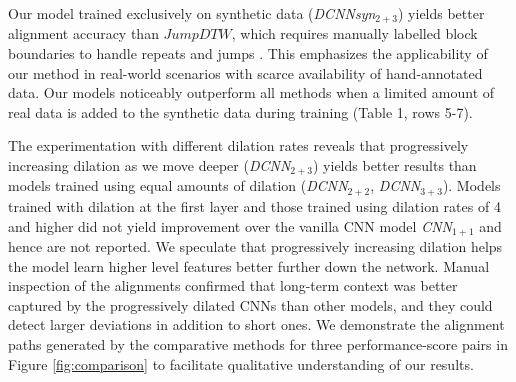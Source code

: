 \documentclass{article}
\begin{document}
Our model trained exclusively on synthetic data (\emph{DCNNsyn}${}_{2+3}$) yields better alignment accuracy than \begin{math}\textit{JumpDTW}\end{math}, which requires manually labelled block boundaries to handle repeats and jumps \cite{Fremerey2010handling}. This emphasizes the applicability of our method in real-world scenarios with scarce availability of hand-annotated data. Our models noticeably outperform all methods when a limited amount of real data is added to the synthetic data during training (Table 1, rows 5-7).
\vspace{0.1cm}
\par The experimentation with different dilation rates reveals that progressively increasing dilation as we move deeper (\emph{DCNN}${}_{2+3}$) yields better results than models trained using equal amounts of dilation (\emph{DCNN}${}_{2+2}$, \emph{DCNN}${}_{3+3}$). Models trained with dilation at the first layer and those trained using dilation rates of 4 and higher did not yield improvement over the vanilla CNN model \emph{CNN}${}_{1+1}$ and hence are not reported. We speculate that progressively increasing dilation helps the model learn higher level features better further down the network. Manual inspection of the alignments confirmed that long-term context was better captured by the progressively dilated CNNs than other models, and they could detect larger deviations in addition to short ones. We demonstrate the alignment paths generated by the comparative methods for three performance-score pairs in Figure \ref{fig:comparison} to facilitate qualitative understanding of our results. %
\end{document}

